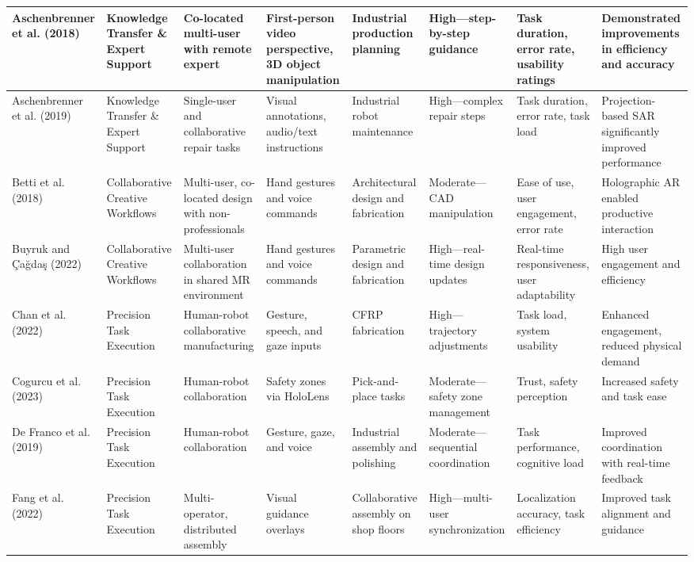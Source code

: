 {\begin{landscape}
\begin{longtable}{@{}p{1.8cm}p{1.8cm}p{1.8cm}p{1.8cm}p{1.8cm}p{1.8cm}p{1.8cm}p{1.8cm}@{}}
Aschenbrenner et al. (2018) & Knowledge Transfer \& Expert Support & Co-located multi-user with remote expert & First-person video perspective, 3D object manipulation & Industrial production planning & High—step-by-step guidance & Task duration, error rate, usability ratings & Demonstrated improvements in efficiency and accuracy \\
\midrule
Aschenbrenner et al. (2019) & Knowledge Transfer \& Expert Support & Single-user and collaborative repair tasks & Visual annotations, audio/text instructions & Industrial robot maintenance & High—complex repair steps & Task duration, error rate, task load & Projection-based SAR significantly improved performance \\
\midrule
Betti et al. (2018) & Collaborative Creative Workflows & Multi-user, co-located design with non-professionals & Hand gestures and voice commands & Architectural design and fabrication & Moderate—CAD manipulation & Ease of use, user engagement, error rate & Holographic AR enabled productive interaction \\
\midrule
Buyruk and Çağdaş (2022) & Collaborative Creative Workflows & Multi-user collaboration in shared MR environment & Hand gestures and voice commands & Parametric design and fabrication & High—real-time design updates & Real-time responsiveness, user adaptability & High user engagement and efficiency \\
\midrule
Chan et al. (2022) & Precision Task Execution & Human-robot collaborative manufacturing & Gesture, speech, and gaze inputs & CFRP fabrication & High—trajectory adjustments & Task load, system usability & Enhanced engagement, reduced physical demand \\
\midrule
Cogurcu et al. (2023) & Precision Task Execution & Human-robot collaboration & Safety zones via HoloLens & Pick-and-place tasks & Moderate—safety zone management & Trust, safety perception & Increased safety and task ease \\
\midrule
De Franco et al. (2019) & Precision Task Execution & Human-robot collaboration & Gesture, gaze, and voice & Industrial assembly and polishing & Moderate—sequential coordination & Task performance, cognitive load & Improved coordination with real-time feedback \\
\midrule
Fang et al. (2022) & Precision Task Execution & Multi-operator, distributed assembly & Visual guidance overlays & Collaborative assembly on shop floors & High—multi-user synchronization & Localization accuracy, task efficiency & Improved task alignment and guidance \\

\end{longtable}
\end{landscape}}
